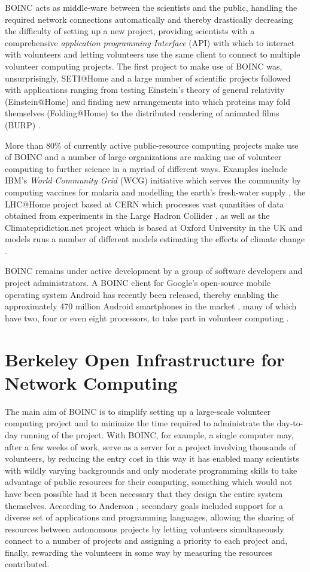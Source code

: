 BOINC acts as middle-ware between the scientists and the public, handling the required network connections automatically and thereby drastically decreasing the difficulty of setting up a new project, providing scientists with a comprehensive \emph{application programming Interface} (API) with which to interact with volunteers and letting volunteers use the same client to connect to multiple volunteer computing projects. The first project to make use of BOINC was, unsurprisingly, SETI@Home and a large number of scientific projects followed with applications ranging from testing Einstein's theory of general relativity (Einstein@Home) \cite{eah} and finding new arrangements into which proteins may fold themselves (Folding@Home) \cite{fah} to the distributed rendering of animated films (BURP) \cite{burp}.

More than 80\% of currently active public-resource computing projects make use of BOINC  and a number of large organizations are making use of volunteer computing to further science in a myriad of different ways. Examples include IBM's \emph{World Community Grid} (WCG) initiative which serves the community by computing vaccines for malaria and modelling the earth's fresh-water supply \cite{wcg}, the LHC@Home project based at CERN which processes vast quantities of data obtained from experiments in the Large Hadron Collider \cite{lhcah}, as well as the Climatepridiction.net project which is based at Oxford University in the UK and models runs a number of different models estimating the effects of climate change \cite{cpdn}.

BOINC remains under active development by a group of software developers and project administrators. A BOINC client for Google's open-source mobile operating system Android has recently been released, thereby enabling the approximately 470 million Android smartphones in the market \cite{mobithinking}, many of which have two, four or even eight processors,      to take part in volunteer computing \cite{android}.

\section{Berkeley Open Infrastructure for Network Computing}
The main aim of BOINC is to simplify setting up a large-scale volunteer computing project and to minimize the time required to administrate the day-to-day running of the project.  With BOINC, for example, a single computer may, after a few weeks of work, serve as a server for a project involving thousands of volunteers, by reducing the entry cost in this way  it has enabled many scientists with wildly varying backgrounds and only moderate programming skills to take advantage of public resources for their computing, something which would not have been possible had it been necessary that they design the entire system themselves. According to Anderson \cite{anderson2004boinc},  secondary goals included support for a diverse set of applications and programming languages, allowing the sharing of resources between autonomous projects by letting volunteers simultaneously connect to a number of projects and assigning a priority to each project   and, finally, rewarding the volunteers in some way by measuring the resources contributed.


